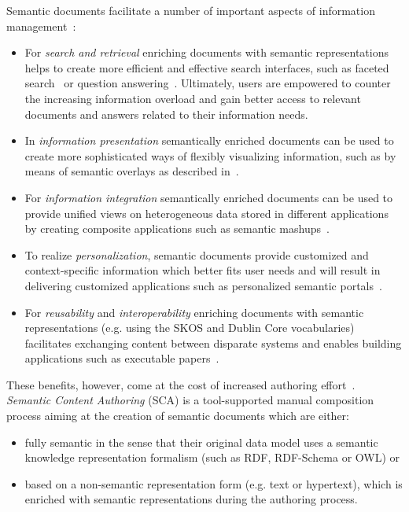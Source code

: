 \documentclass[10pt, conference, compsocconf]{IEEEtran}
\begin{document}
Semantic documents facilitate a number of important aspects of information management~\cite{rdface}:
\begin{itemize}
	\item For \emph{search and retrieval} enriching documents with semantic representations helps to create more efficient and effective search interfaces, such as faceted search~\cite{tunkenlang2009faceted} or question answering~\cite{Lopez2011}.
		Ultimately, users are empowered to counter the increasing information overload and gain better access to relevant documents and answers related to their information needs.
	\item In \emph{information presentation} semantically enriched documents can be used to create more sophisticated ways of flexibly visualizing information, such as by means of semantic overlays as described in~\cite{Burel2009}.
	\item For \emph{information integration} semantically enriched documents can be used to provide unified views on heterogeneous data stored in different applications by creating composite applications such as semantic mashups~\cite{Ankolekar2007}.
	\item To realize \emph{personalization}, semantic documents provide customized and context-specific information which better fits user needs and will
result in delivering customized applications such as personalized semantic portals~\cite{ecs2007}.
	\item For \emph{reusability} and \emph{interoperability} enriching documents with semantic representations (e.g. using the SKOS and Dublin Core vocabularies) facilitates exchanging content between disparate systems and enables building applications such as executable papers~\cite{Muller2011}. \\
\end{itemize}

These benefits, however, come at the cost of increased authoring effort~\cite{hasida2007,uren2006}.
\emph{Semantic Content Authoring} (SCA) is a tool-supported manual composition process aiming at the creation of semantic documents which are either:
\begin{itemize}
	\item fully semantic in the sense that their original data model uses a semantic knowledge representation formalism (such as RDF, RDF-Schema or OWL) or
	\item based on a non-semantic representation form (e.g. text or hypertext), which is enriched with semantic representations during the authoring process.\\
\end{itemize}
\end{document}

